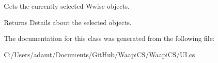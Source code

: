 Gets the currently selected Wwise objects. 

\begin{DoxyReturn}{Returns}
Details about the selected objects.
\end{DoxyReturn}


The documentation for this class was generated from the following file\+:\begin{DoxyCompactItemize}
\item 
C\+:/\+Users/adamt/\+Documents/\+Git\+Hub/\+Waapi\+C\+S/\+Waapi\+C\+S/U\+I.\+cs\end{DoxyCompactItemize}
